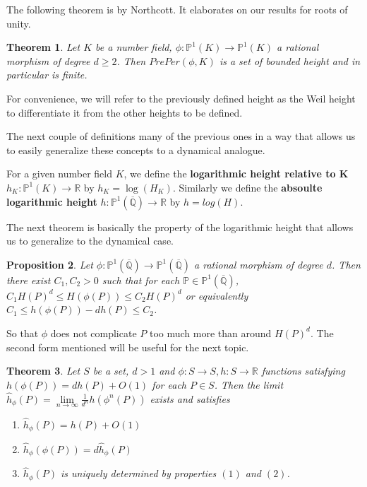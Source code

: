 \documentclass[12pt]{amsart}
\newtheorem{thm}{Theorem}[subsection]
\newtheorem{prop}[thm]{Proposition}
\theoremstyle{definition}
\theoremstyle{remark}
\theoremstyle{definition}
\newcommand{\R}{\mathbb{R}}
\newcommand{\Q}{\mathbb{Q}}
\renewcommand{\P}{\mathbb{P}}
\begin{document}
The following theorem is by Northcott. It elaborates on our results for roots of unity.

\begin{thm}
Let $K$ be a number field, $\phi: \P^1(K) \rightarrow \P^1(K)$ a rational morphism of degree $d\geq 2$. Then $PrePer(\phi, K)$ is a set of bounded height and in particular is finite. 
\end{thm}

For convenience, we will refer to the previously defined height as the Weil height to differentiate it from the other heights to be defined.

The next couple of definitions many of the previous ones in a way that allows us to easily generalize these concepts to a dynamical analogue.

For a given number field $K$, we define the \textbf{logarithmic height relative to K} $h_K: \P^1(K) \rightarrow \R$ by $h_K = \log(H_K)$. Similarly we define the \textbf{absoulte logarithmic height} $h: \P^1(\overline{\Q}) \rightarrow \R$ by $h=log(H)$.

The next theorem is basically the property of the logarithmic height that allows us to generalize to the dynamical case. 

\begin{prop}

Let $\phi: \P^1(\overline{\Q}) \rightarrow \P^1(\overline{\Q})$ a rational morphism of degree $d$. Then there exist $C_1,C_2 > 0$ such that for each $\P \in \P^1(\overline{\Q})$, $C_1H(P)^d \leq H(\phi(P)) \leq C_2H(P)^d$ or equivalently $C_1 \leq h(\phi(P))-dh(P) \leq C_2$.   

\end{prop}

So that $\phi$ does not complicate $P$ too much more than around $H(P)^d$. The second form mentioned will be useful for the next topic.

\begin{thm}

Let $S$ be a set, $d>1$ and $\phi:S \rightarrow S, h:S \rightarrow \R$ functions satisfying $h(\phi(P)) = dh(P) + O(1)$ for each $P \in S$. Then the limit $\hat{h}_\phi(P) = \lim\limits_{n\rightarrow \infty} \frac{1}{d^n}h(\phi^n(P))$ exists and satisfies 

\begin{enumerate}

\item $\hat{h}_\phi(P) = h(P) + O(1)$
\item $\hat{h}_\phi(\phi(P)) = d\hat{h}_\phi(P)$
\item $\hat{h}_\phi(P)$ is uniquely determined by properties $(1)$ and $(2)$.

\end{enumerate} 

\end{thm}
\end{document}
